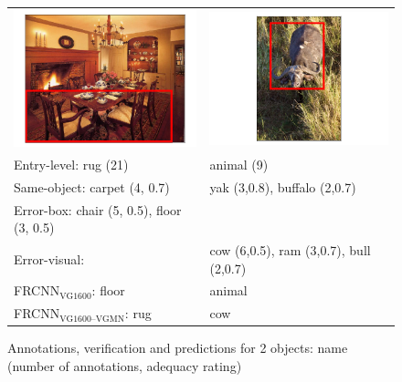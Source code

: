 \begin{figure}
	\centering
	\footnotesize
	\begin{tabular}{p{3.7cm}p{3.7cm}}
		\includegraphics[scale=.2]{images/556_1063956_seed_ambiguous.png} &
		\includegraphics[scale=.2]{images/2657_1069343_singleton_obj.png} 
		\\
		Entry-level: rug (21) &  animal (9)\\
		\midrule
		Same-object: carpet (4, 0.7) &  yak (3,0.8), buffalo (2,0.7) \\
		Error-box: chair (5, 0.5), floor (3, 0.5) & \\
		Error-visual:  & cow (6,0.5), ram (3,0.7), bull (2,0.7)\\
		\midrule
		FRCNN$_{\text{VG1600}}$: floor & animal\\
		FRCNN$_{\text{VG1600--VGMN}}$: rug & cow \\
	\end{tabular}
	\caption{Annotations, verification and predictions for 2 objects: name (number of annotations, adequacy rating)}
	\label{fig:mistakes}
\end{figure}

